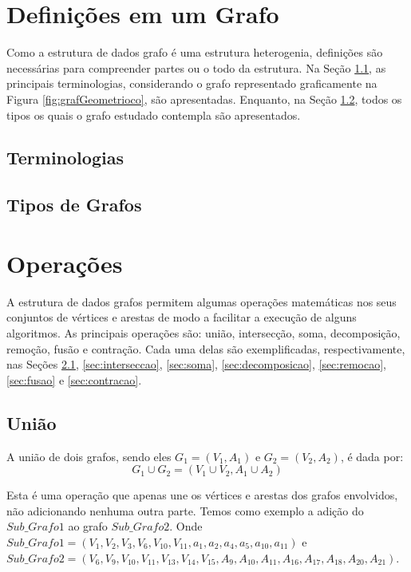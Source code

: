 \documentclass[
12pt,
a4paper,
semrecuonosumario,
sumario = abnt-6027-2012]{report}
\begin{document}
	\chapter{Definições em um Grafo }\label{cap:definicoesGrafo}

	Como a estrutura de dados grafo é uma estrutura heterogenia, definições são necessárias para compreender partes ou o todo da estrutura. Na Seção \ref{sec:terminologias}, as principais terminologias, considerando o grafo representado graficamente na Figura  \ref{fig:grafGeometrioco}, são apresentadas. Enquanto, na Seção \ref{sec:tiposGrafos}, todos os tipos os quais o grafo estudado contempla são apresentados.

	\section{Terminologias}\label{sec:terminologias}


	\section{Tipos de Grafos}\label{sec:tiposGrafos}


	\chapter{Operações}\label{cap:operacoes}

	A estrutura de dados grafos permitem algumas operações matemáticas nos seus conjuntos de vértices e arestas de modo a facilitar a execução de alguns algoritmos. As principais operações são: união, intersecção, soma, decomposição, remoção, fusão e contração. Cada uma delas são exemplificadas, respectivamente, nas Seções \ref{sec:uniao}, \ref{sec:interseccao}, \ref{sec:soma}, \ref{sec:decomposicao}, \ref{sec:remocao}, \ref{sec:fusao} e \ref{sec:contracao}.

	\section{União}\label{sec:uniao}
        A união de dois grafos, sendo eles $G_1 = (V_1, A_1)$ e $G_2 = (V_2, A_2)$, é dada por:
        \[
        G_1 \cup G_2 = (V_1 \cup V_2, A_1 \cup A_2)
        \]

        Esta é uma operação que apenas une os vértices e arestas dos grafos envolvidos, não adicionando nenhuma outra parte.
        Temos como exemplo a adição do $Sub\_Grafo1$ ao grafo $Sub\_Grafo2$.
        Onde $Sub\_Grafo1 = (V_1, V_2, V_3, V_6, V_{10}, V_{11}, a_1, a_2, a_4, a_5, a_{10}, a_{11} )$ e $Sub\_Grafo2 = (V_6, V_9, V_{10}, V_{11}, V_{13}, V_{14}, V_{15}, A_{9}, A_{10}, A_{11}, A_{16}, A_{17}, A_{18}, A_{20}, A_{21})$.
\end{document}
